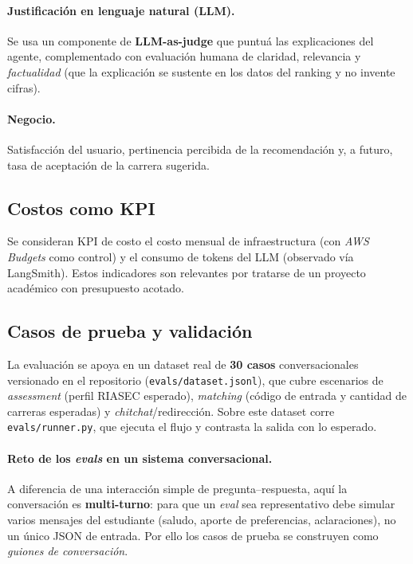 \paragraph{Justificaci\'on en lenguaje natural (LLM).} Se usa un componente de
\textbf{LLM-as-judge} que puntu\'a las explicaciones del agente, complementado con
evaluaci\'on humana de claridad, relevancia y \emph{factualidad} (que la
explicaci\'on se sustente en los datos del ranking y no invente cifras).

\paragraph{Negocio.} Satisfacci\'on del usuario, pertinencia percibida de la
recomendaci\'on y, a futuro, tasa de aceptaci\'on de la carrera sugerida.

\subsection{Costos como KPI}

Se consideran KPI de costo el costo mensual de infraestructura (con \emph{AWS
Budgets} como control) y el consumo de tokens del LLM (observado v\'ia LangSmith).
Estos indicadores son relevantes por tratarse de un proyecto acad\'emico con
presupuesto acotado.

\subsection{Casos de prueba y validaci\'on}

La evaluaci\'on se apoya en un dataset real de \textbf{30 casos}
conversacionales versionado en el repositorio
(\texttt{evals/dataset.jsonl}), que cubre escenarios de \emph{assessment}
(perfil RIASEC esperado), \emph{matching} (c\'odigo de entrada y cantidad de
carreras esperadas) y \emph{chitchat}/redirecci\'on. Sobre este dataset corre
\texttt{evals/runner.py}, que ejecuta el flujo y contrasta la salida con lo
esperado.

\paragraph{Reto de los \emph{evals} en un sistema conversacional.} A diferencia de
una interacci\'on simple de pregunta--respuesta, aqu\'i la conversaci\'on es
\textbf{multi-turno}: para que un \emph{eval} sea representativo debe simular
varios mensajes del estudiante (saludo, aporte de preferencias, aclaraciones),
no un \'unico JSON de entrada. Por ello los casos de prueba se construyen como
\emph{guiones de conversaci\'on}.

